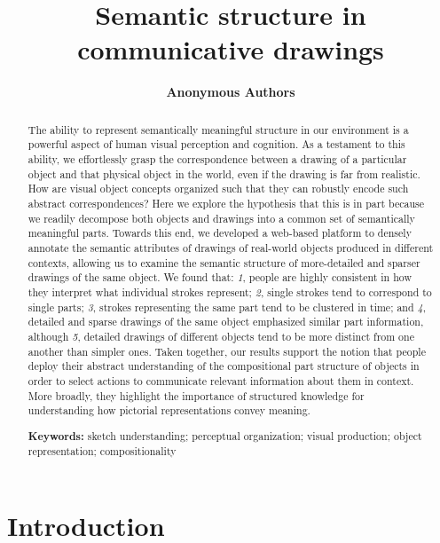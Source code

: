 \documentclass[10pt,letterpaper]{article}
\title{Semantic structure in communicative drawings}
\author{\large \bf Anonymous Authors}
\begin{document}
\maketitle 

\begin{abstract}

The ability to represent semantically meaningful structure in our environment is a powerful aspect of human visual perception and cognition. 
As a testament to this ability, we effortlessly grasp the correspondence between a drawing of a particular object and that physical object in the world, even if the drawing is far from realistic. 
How are visual object concepts organized such that they can robustly encode such abstract correspondences?
Here we explore the hypothesis that this is in part because we readily decompose both objects and drawings into a common set of semantically meaningful parts. 
Towards this end, we developed a web-based platform to densely annotate the semantic attributes of drawings of real-world objects produced in different contexts, allowing us to examine the semantic structure of more-detailed and sparser drawings of the same object. 
We found that: \textit{1}, people are highly consistent in how they interpret what individual strokes represent; \textit{2}, single strokes tend to correspond to single parts; \textit{3}, strokes representing the same part tend to be clustered in time; and \textit{4}, detailed and sparse drawings of the same object emphasized similar part information, although \textit{5}, detailed drawings of different objects tend to be more distinct from one another than simpler ones. 
Taken together, our results support the notion that people deploy their abstract understanding of the compositional part structure of objects in order to select actions to communicate relevant information about them in context. 
More broadly, they highlight the importance of structured knowledge for understanding how pictorial representations convey meaning. 

\textbf{Keywords:} 
sketch understanding; perceptual organization; visual production; object representation; compositionality
\end{abstract}

\section{Introduction}

\end{document}

